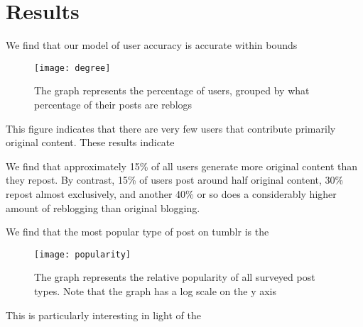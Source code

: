 \section{Results}
\label{sec:-res}
We find that our model of user accuracy is accurate within bounds
%  

\begin{figure}[bht]
\centering
 \texttt{[image: degree]}
  \caption{The graph represents the percentage of users, grouped by what percentage of their posts are reblogs}
  \label{fig:-deg}
\end{figure}

This figure indicates that there are very few users that contribute 
primarily original content.  These results indicate 

We find that approximately 15\% of all users generate more original 
content than they repost.  By contrast, 15\% of users post around half 
original content, 30\% repost almost exclusively, and another 40\% or 
so does a considerably higher amount of reblogging than original 
blogging.

We find that the most popular type of post on tumblr is the
\begin{figure}[bht]
\centering
 \texttt{[image: popularity]}
  \caption{The graph represents the relative popularity of all surveyed post types.  Note that the graph has a log scale on the y axis}
  \label{fig:-pop}
\end{figure}
This is particularly interesting in light of the 

